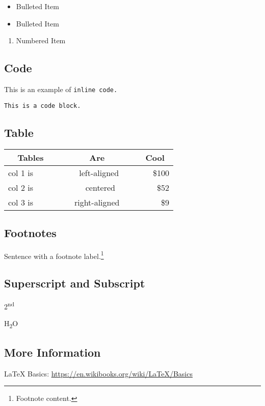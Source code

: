 \begin{itemize}
\item
  Bulleted Item\\
\item
  Bulleted Item\\
\end{itemize}

\begin{enumerate}
\def\labelenumi{\arabic{enumi}.}
\setcounter{enumi}{1}
\item
  Numbered Item
\end{enumerate}

\subsection{Code}

This is an example of \texttt{inline\ code.}

\texttt{This\ is\ a\ code\ block.}

\subsection{Table}

\begin{longtable}[]{@{}lcr@{}}
\toprule
~~Tables~~ & ~~~~~~Are~~~~~~ & ~Cool~\tabularnewline
\midrule
\endhead
col 1 is & ~left-aligned & \$100\tabularnewline
col 2 is & ~~~ centered~~ & ~\$52\tabularnewline
col 3 is & right-aligned & ~~\$9\tabularnewline
\bottomrule
\end{longtable}

\subsection{Footnotes}

Sentence with a footnote label.\footnote{Footnote content.}

\subsection{Superscript and Subscript}

2\textsuperscript{nd}

H\textsubscript{2}O

\subsection{More Information}

LaTeX Basics: \href{https://en.wikibooks.org/wiki/LaTeX/Basics}{https://en.wikibooks.org/wiki/LaTeX/Basics}
